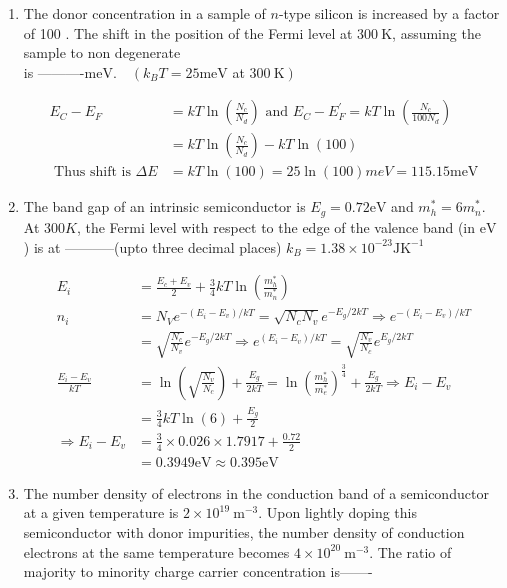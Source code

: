 \begin{enumerate}
	\item The donor concentration in a sample of $n$-type silicon is increased by a factor of 100 . The shift in the position of the Fermi level at $300 \mathrm{~K}$, assuming the sample to non degenerate\\ is ----------$\mathrm{meV} . \quad\left(k_{B} T=25 \mathrm{meV}\right.$ at $\left.300 \mathrm{~K}\right)$
	{	}
	\begin{answer}
		\begin{align*}
		E_{C}-E_{F}&=k T \ln \left(\frac{N_{c}}{N_{d}}\right)\text{ and }E_{C}-E_{F}^{\prime}=k T \ln \left(\frac{N_{c}}{100 N_{d}}\right)\\&=k T \ln \left(\frac{N_{c}}{N_{d}}\right)-k T \ln (100)\\
		\text{	Thus shift is }\Delta E&=k T \ln (100)=25 \ln (100) m e V=115.15 \mathrm{meV}
		\end{align*}
	\end{answer}
	\item The band gap of an intrinsic semiconductor is $E_{g}=0.72 \mathrm{eV}$ and $m_{h}^{*}=6 m_{n}^{*} .$ At $300 K$, the Fermi level with respect to the edge of the valence band (in $\mathrm{eV}$ ) is at -----------(upto three decimal places) $k_{B}=1.38 \times 10^{-23} \mathrm{JK}^{-1}$
	{	}
	\begin{answer}
		\begin{align*}
		E_{i}&=\frac{E_{c}+E_{v}}{2}+\frac{3}{4} k T \ln \left(\frac{m_{h}^{*}}{m_{n}^{*}}\right)\\
		n_{i}&=N_{V} e^{-\left(E_{i}-E_{v}\right) / k T}=\sqrt{N_{c} N_{v}} e^{-E_{g} / 2 k T} \Rightarrow e^{-\left(E_{i}-E_{v}\right) / k T}\\&=\sqrt{\frac{N_{c}}{N_{v}}} e^{-E_{g} / 2 k T} \Rightarrow e^{\left(E_{i}-E_{v}\right) / k T}=\sqrt{\frac{N_{v}}{N_{c}}} e^{E_{g} / 2 k T}\\
		\frac{E_{i}-E_{v}}{k T}&=\ln \left(\sqrt{\frac{N_{v}}{N_{c}}}\right)+\frac{E_{g}}{2 k T}=\ln \left(\frac{m_{h}^{*}}{m_{e}^{*}}\right)^{\frac{3}{4}}+\frac{E_{g}}{2 k T} \Rightarrow E_{i}-E_{v}\\&=\frac{3}{4} k T \ln (6)+\frac{E_{g}}{2}\\
		\Rightarrow E_{i}-E_{v}&=\frac{3}{4} \times 0.026 \times 1.7917+\frac{0.72}{2}\\&=0.3949 \mathrm{eV} \approx 0.395 \mathrm{eV}
		\end{align*}
	\end{answer}
	\item The number density of electrons in the conduction band of a semiconductor at a given temperature is $2 \times 10^{19} \mathrm{~m}^{-3}$. Upon lightly doping this semiconductor with donor impurities, the number density of conduction electrons at the same temperature becomes $4 \times 10^{20} \mathrm{~m}^{-3} .$ The ratio of majority to minority charge carrier concentration is-------

\end{enumerate}
